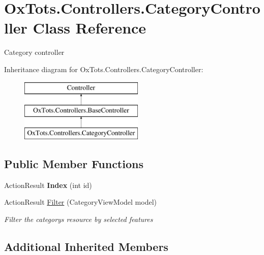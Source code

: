 \hypertarget{class_ox_tots_1_1_controllers_1_1_category_controller}{}\section{Ox\+Tots.\+Controllers.\+Category\+Controller Class Reference}
\label{class_ox_tots_1_1_controllers_1_1_category_controller}


Category controller  


Inheritance diagram for Ox\+Tots.\+Controllers.\+Category\+Controller\+:\begin{figure}[H]
\begin{center}
\leavevmode
\includegraphics[height=3.000000cm]{class_ox_tots_1_1_controllers_1_1_category_controller}
\end{center}
\end{figure}
\subsection*{Public Member Functions}
\begin{DoxyCompactItemize}
\item 
\mbox{\label{class_ox_tots_1_1_controllers_1_1_category_controller_a922df9725d5d1c1b72ea0b7df2eafa42}} 
Action\+Result {\bfseries Index} (int id)
\item 
Action\+Result \mbox{\hyperlink{class_ox_tots_1_1_controllers_1_1_category_controller_a391a2d3aed302502894c560096e54358}{Filter}} (Category\+View\+Model model)
\begin{DoxyCompactList}\small\item\em Filter the category\textquotesingle{}s resource by selected features \end{DoxyCompactList}\end{DoxyCompactItemize}
\subsection*{Additional Inherited Members}


